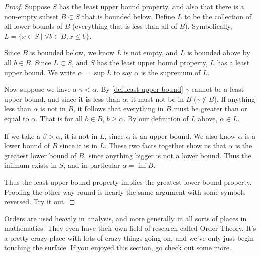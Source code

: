 \begin{proof}
    Suppose $S$ has the least upper bound property, and also that there is a
    non-empty subset $B\subset S$ that is bounded below. Define $L$ to be the
    collection of all lower bounds of $B$ (everything that is less than all of
    $B$). Symbolically, $L = \{x\in S \mid \forall b\in B, x\leq b\}$.

    Since $B$ is bounded below, we know $L$ is not empty, and $L$ is bounded
    above by all $b\in B$. Since $L\subset S$, and $S$ has the least upper bound
    property, $L$ has a least upper bound. We write $\alpha = \sup{L}$ to say
    $\alpha$ is the supremum of $L$.

    Now suppose we have a $\gamma < \alpha$. By \cref{def:least-upper-bound}
    $\gamma$ cannot be a least upper bound, and since it is less than $\alpha$,
    it must not be in $B$ ($\gamma\notin B$). If anything less than $\alpha$ is
    not in $B$, it follows that everything in $B$ must be greater than or equal
    to $\alpha$. That is for all $b\in B$, $b \geq \alpha$. By our definition of
    $L$ above, $\alpha\in L$.

    If we take a $\beta > \alpha$, it is not in $L$, since $\alpha$ is an upper
    bound. We also know $\alpha$ is a lower bound of $B$ since it is in $L$.
    These two facts together show us that $\alpha$ is the greatest lower bound
    of $B$, since anything bigger is not a lower bound. Thus the infimum exists
    in $S$, and in particular $\alpha = \inf{B}$.

    Thus the least upper bound property implies the greatest lower bound
    property. Proofing the other way round is nearly the same argument with some
    symbols reversed. Try it out.
\end{proof}

Orders are used heavily in analysis, and more generally in all sorts of places
in mathematics. They even have their own field of research called Order Theory.
It's a pretty crazy place with lots of crazy things going on, and we've only
just begin touching the surface. If you enjoyed this section, go check out some
more.


